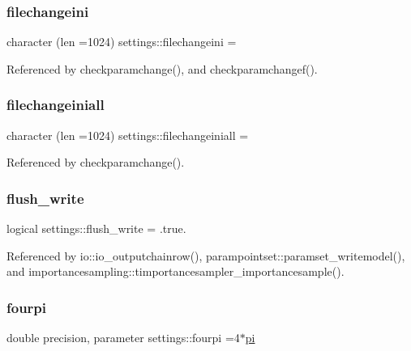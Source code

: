 \mbox{\label{namespacesettings_ae3545d47de8db723b192e3bc79f95e99}} 
\subsubsection{\texorpdfstring{filechangeini}{filechangeini}}
{\footnotesize\ttfamily character (len =1024) settings\+::filechangeini = \textquotesingle{}\textquotesingle{}}



Referenced by checkparamchange(), and checkparamchangef().

\mbox{\label{namespacesettings_aa364554c9b5868156913823eaa6b5185}} 
\subsubsection{\texorpdfstring{filechangeiniall}{filechangeiniall}}
{\footnotesize\ttfamily character (len =1024) settings\+::filechangeiniall = \textquotesingle{}\textquotesingle{}}



Referenced by checkparamchange().

\mbox{\label{namespacesettings_ae38825eb811eae327d68db37b75023aa}} 
\subsubsection{\texorpdfstring{flush\+\_\+write}{flush\_write}}
{\footnotesize\ttfamily logical settings\+::flush\+\_\+write = .true.}



Referenced by io\+::io\+\_\+outputchainrow(), parampointset\+::paramset\+\_\+writemodel(), and importancesampling\+::timportancesampler\+\_\+importancesample().

\mbox{\label{namespacesettings_ad4683f1ccdfb64cdf9aa5643ce991cd5}} 
\subsubsection{\texorpdfstring{fourpi}{fourpi}}
{\footnotesize\ttfamily double precision, parameter settings\+::fourpi =4$\ast$\mbox{\hyperlink{namespacesettings_a57710b73441b5ec0babcaa48cd333055}{pi}}}

